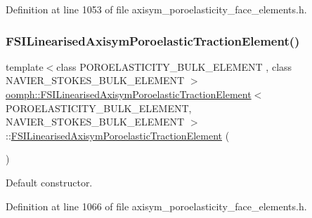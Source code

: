 Definition at line 1053 of file axisym\+\_\+poroelasticity\+\_\+face\+\_\+elements.\+h.

\mbox{\label{classoomph_1_1FSILinearisedAxisymPoroelasticTractionElement_ae2a2fb1ee26e98653ceebe2450f2c0a5}} 
\subsubsection{\texorpdfstring{F\+S\+I\+Linearised\+Axisym\+Poroelastic\+Traction\+Element()}{FSILinearisedAxisymPoroelasticTractionElement()}\hspace{0.1cm}{\footnotesize\ttfamily [2/2]}}
{\footnotesize\ttfamily template$<$class P\+O\+R\+O\+E\+L\+A\+S\+T\+I\+C\+I\+T\+Y\+\_\+\+B\+U\+L\+K\+\_\+\+E\+L\+E\+M\+E\+NT , class N\+A\+V\+I\+E\+R\+\_\+\+S\+T\+O\+K\+E\+S\+\_\+\+B\+U\+L\+K\+\_\+\+E\+L\+E\+M\+E\+NT $>$ \\
\hyperlink{classoomph_1_1FSILinearisedAxisymPoroelasticTractionElement}{oomph\+::\+F\+S\+I\+Linearised\+Axisym\+Poroelastic\+Traction\+Element}$<$ P\+O\+R\+O\+E\+L\+A\+S\+T\+I\+C\+I\+T\+Y\+\_\+\+B\+U\+L\+K\+\_\+\+E\+L\+E\+M\+E\+NT, N\+A\+V\+I\+E\+R\+\_\+\+S\+T\+O\+K\+E\+S\+\_\+\+B\+U\+L\+K\+\_\+\+E\+L\+E\+M\+E\+NT $>$\+::\hyperlink{classoomph_1_1FSILinearisedAxisymPoroelasticTractionElement}{F\+S\+I\+Linearised\+Axisym\+Poroelastic\+Traction\+Element} (\begin{DoxyParamCaption}{ }\end{DoxyParamCaption})\hspace{0.3cm}{\ttfamily [inline]}}



Default constructor. 



Definition at line 1066 of file axisym\+\_\+poroelasticity\+\_\+face\+\_\+elements.\+h.



